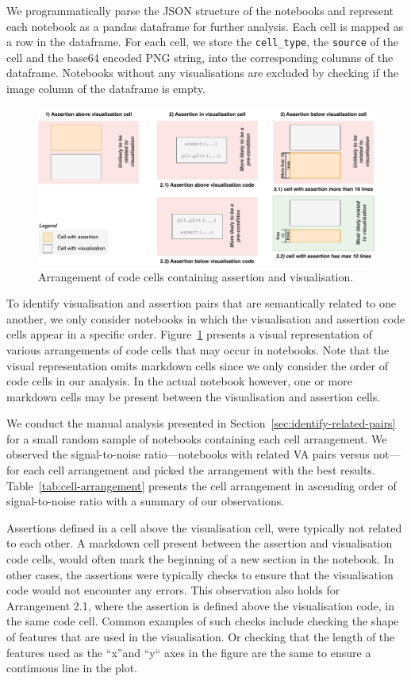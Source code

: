 \documentclass[conference]{IEEEtran}
\begin{document}
We programmatically parse the JSON structure of the notebooks and represent each notebook as a pandas dataframe for further analysis. Each cell is mapped as a row in the dataframe. For each cell, we store the \texttt{cell\_type}, the \texttt{source} of the cell and the base64 encoded PNG string, into the corresponding columns of the dataframe. Notebooks without any visualisations are excluded by checking if the image column of  the dataframe is empty.

\begin{figure}
  \centering
  \includegraphics[width=\linewidth]{nb-structure.pdf}
  \caption{Arrangement of code cells containing assertion and
    visualisation.}\label{fig:cell-arrangement}
\end{figure}

To identify visualisation and assertion pairs that are semantically related to one another, we only consider notebooks in which the visualisation and assertion code cells appear in a specific order. Figure~\ref{fig:cell-arrangement} presents a visual representation of various arrangements of code cells that may occur in notebooks. Note that the visual representation omits markdown cells since we only consider the order of code cells in our analysis. In the actual notebook however, one or more markdown cells may be present between the visualisation and assertion cells.

We conduct the manual analysis presented in Section~\ref{sec:identify-related-pairs} for a small random sample of notebooks containing each cell arrangement. We observed the signal-to-noise ratio---notebooks with related VA pairs versus not---for each cell arrangement and picked the arrangement with the best results. Table~\ref{tab:cell-arrangement} presents the cell arrangement in ascending order of signal-to-noise ratio with a summary of our observations.

Assertions defined in a cell above the visualisation cell, were typically not related to each other. A markdown cell present between the assertion and visualisation code cells, would often mark the beginning of a new section in the notebook. In other cases, the assertions were typically checks to ensure that the visualisation code would not encounter any errors. This observation also holds for Arrangement 2.1, where the assertion is defined above the visualisation code, in the same code cell. Common examples of such checks include checking the shape of features that are used in the visualisation. Or checking that the length of the features used as the ``x''and ``y`` axes in the figure are the same to ensure a continuous line in the plot.
\end{document}
